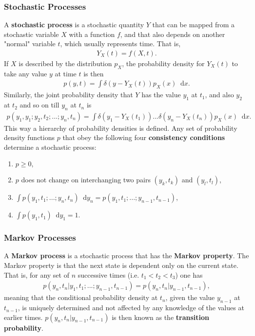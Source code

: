 \documentclass[twoside,english]{uiofysmaster}
\newcommand*\dif{\mathop{}\!\mathrm{d}}
\begin{document}
\subsubsection{Stochastic Processes}
A \textbf{stochastic process} is a
stochastic quantity $Y$ that can be mapped from a stochastic variable
$X$ with a function $f$, and that also depends on another "normal"
variable $t$, which usually represents time. That is,
\begin{align}
	Y_X (t) = f(X,t).
\end{align}
If $X$ is described by the distribution $p_X$, the probability density for $Y_X(t)$ to take any value $y$ at time $t$ is then
\begin{align}
	p (y, t) = \int \delta (y- Y_X (t)) p_X (x) \dif x.
\end{align}
Similarly, the joint probability density that $Y$ has the value $y_1$
at $t_1$, and also $y_2$ at $t_2$ and so on till $y_n$ at $t_n$ is
\begin{align}
	p (y_1, y_1; y_2, t_2; ...; y_n, t_n)
	= \int \delta (y_1 - Y_X (t_1)) ... \delta (y_n - Y_X (t_n)) p_X (x) \dif x.
\end{align}
This way a hierarchy of probability densities is defined.
Any set of probability density functions $p$ that obey the following four \textbf{consistency conditions} determine a stochastic process:
\begin{mdframed}[hidealllines=true,backgroundcolor=blue!20]
\begin{enumerate}
	\item $p \geq 0$,
	\item $p$ does not change on interchanging two pairs $(y_k, t_k)$ and $(y_l, t_l)$,
	\item $\int p (y_1, t_1; ...; y_n, t_n) \dif y_n = p (y_1, t_1; ...; y_{n-1}, t_{n-1}) $,
	\item $\int p (y_1, t_1) \dif y_1 = 1$.
\end{enumerate}
\end{mdframed}


\subsubsection{Markov Processes}
A \textbf{Markov process} is a stochastic process that has the
\textbf{Markov property}. The Markov property is that the next state
is dependent only on the current state. That is, for any set of $n$ successive times
(i.e. $t_1<t_2<t_3$) one has
\begin{align}
	p (y_n, t_n | y_1, t_1; ...; y_{n-1}, t_{n-1}) =p (y_n, t_n | y_{n-1}, t_{n-1}),
\end{align}
meaning that the conditional probability density at $t_n$, given the value $y_{n-1}$ at $t_{n-1}$, is uniquely determined and not affected by any knowledge of the values at earlier times. $p (y_n, t_n | y_{n-1}, t_{n-1})$ is then known as the \textbf{transition probability}.
\end{document}
